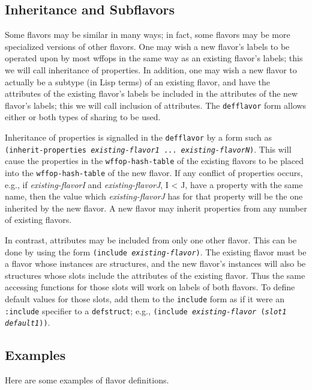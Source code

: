 \subsection{Inheritance and Subflavors}

Some flavors may be similar in many ways; in fact, some flavors may be
more specialized versions of other flavors.  One may wish a new flavor's
labels to be operated upon by most wffops in the same way as an existing
flavor's labels; this we will call inheritance of properties.  In addition,
one may wish a new flavor to actually be a subtype (in Lisp terms)
of an existing flavor, and have the attributes of the existing flavor's 
labels be included in the attributes of the new flavor's labels; this we
will call inclusion of attributes.   The {\tt defflavor} form allows either
or both types of sharing to be used.

Inheritance of properties is signalled in the {\tt defflavor} by a form such
as {\tt (inherit-properties {\it existing-flavor1} ... {\it existing-flavorN})}.
This will cause the properties in the {\tt wffop-hash-table} of the 
existing flavors to be placed into the {\tt wffop-hash-table} of the new
flavor. If any conflict of properties occurs, e.g., if {\it existing-flavorI}
and  {\it existing-flavorJ}, I < J, have a property with the same name, then
the value which {\it existing-flavorJ} has for that property will be 
the one inherited by the new flavor. A new flavor may inherit properties 
from any number of existing flavors.

In contrast, attributes may be included from only one other flavor.  This
can be done by using the form {\tt (include {\it existing-flavor})}. The 
existing flavor must be a flavor whose instances are structures, and the
new flavor's instances will also be structures whose slots include the
attributes of the existing flavor.  Thus the same accessing functions for
those slots will work on labels of both flavors.  To define default
values for those slots, add them to the {\tt include} form as if it were
an {\tt :include} specifier to a {\tt defstruct}; e.g., 
{\tt (include {\it existing-flavor} ({\it slot1 default1}))}.

\subsection{Examples}

Here are some examples of flavor definitions.

